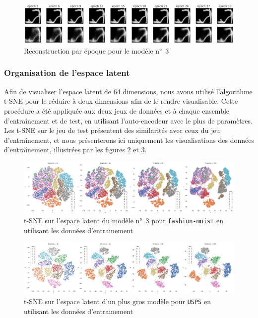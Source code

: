 \documentclass{article}
\begin{document}
\begin{figure}[htbp]
    \centering
    \includegraphics*[width=\textwidth]{reconstruction_per_epoch_big_model.pdf}
    \caption{Reconstruction par époque pour le modèle n°~3}
    \label{fig:perEpochBig}
\end{figure}

\subsubsection{Organisation de l'espace latent}

Afin de visualiser l'espace latent de 64 dimensions, nous avons utilisé l'algorithme t-SNE pour le réduire à deux dimensions afin de le rendre visualisable. Cette procédure a été appliquée aux deux jeux de données et à chaque ensemble d'entraînement et de test, en utilisant l'auto-encodeur avec le plus de paramètres. Les t-SNE sur le jeu de test présentent des similarités avec ceux du jeu d'entraînement, et nous présenterons ici uniquement les visualisations des données d'entraînement, illustrées par les figures \ref{fig:tsneMnist} et \ref{fig:tsneUsps}.

\begin{figure}[htbp]
    \centering
    \includegraphics*[width=.75\textwidth]{tsne_mnist_train_big.pdf}
    \caption{t-SNE sur l'espace latent du modèle n°~3 pour \texttt{fashion-mnist} en utilisant les données d'entrainement}
    \label{fig:tsneMnist}
\end{figure}

\begin{figure}[htbp]
    \centering
    \includegraphics*[width=.75\textwidth]{tsne_usps_train_big.pdf}
    \caption{t-SNE sur l'espace latent d'un plus gros modèle pour \texttt{USPS} en utilisant les données d'entrainement}
    \label{fig:tsneUsps}
\end{figure}
\end{document}
